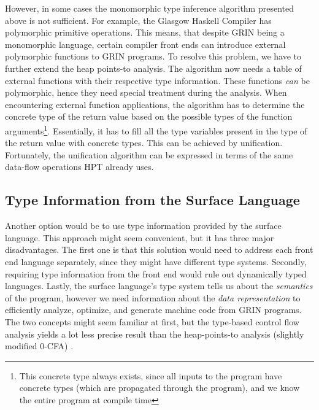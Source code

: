 \documentclass[main.tex]{subfiles}
\begin{document}
	However, in some cases the monomorphic type inference algorithm presented above is not sufficient. For example, the Glasgow Haskell Compiler has polymorphic primitive operations. This means, that despite GRIN being a monomorphic language, certain compiler front ends can introduce external polymorphic functions to GRIN programs. To resolve this problem, we have to further extend the heap points-to analysis. The algorithm now needs a table of external functions with their respective type information. These functions \emph{can} be polymorphic, hence they need special treatment during the analysis. When encountering external function applications, the algorithm has to determine the concrete type of the return value based on the possible types of the function arguments\footnote{This concrete type always exists, since all inputs to the program have concrete types (which are propagated through the program), and we know the entire program at compile time}. Essentially, it has to fill all the type variables present in the type of the return value with concrete types. This can be achieved by unification. Fortunately, the unification algorithm can be expressed in terms of the same data-flow operations HPT already uses.
	
	\subsection{Type Information from the Surface Language}
	
	Another option would be to use type information provided by the surface language. This approach might seem convenient, but it has three major disadvantages. The first one is that this solution would need to address each front end language separately, since they might have different type systems. Secondly, requiring type information from the front end would rule out dynamically typed languages. Lastly, the surface language's type system tells us about the \textit{semantics} of the program, however we need information about the \textit{data representation} to efficiently analyze, optimize, and generate machine code from GRIN programs. The two concepts might seem familiar at first, but the type-based control flow analysis yields a lot less precise result than the heap-points-to analysis (slightly modified 0-CFA) \cite{mlton-cfa}. 
	
\end{document}
